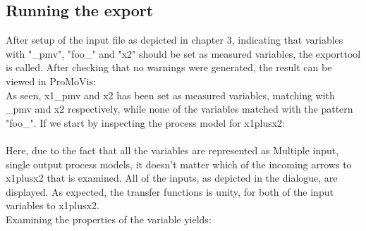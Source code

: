 \subsection{Running the export}
After setup of the input file as depicted in chapter 3, indicating that variables with "\_pmv", "foo\_" and "x2" should be set as measured variables, the exporttool is called. After checking that no warnings were generated, the result can be viewed in ProMoVis:
\setlength\fboxsep{0pt}
\setlength\fboxrule{0.5pt}
\\\newline
As seen,  x1\_pmv and x2 has been set as measured variables, matching with \_pmv and x2 respectively, while none of the variables matched with the pattern "foo\_". If we start by inspecting the process model for x1plusx2:\\\newline
\setlength\fboxsep{0pt}
\setlength\fboxrule{0.5pt}
\\\newline
Here, due to the fact that all the variables are represented as Multiple input, single output process models, it doesn't matter which of the incoming arrows to x1plusx2 that is examined. All of the inputs, as depicted in the dialogue, are displayed. As expected, the transfer functions is unity, for both of the input variables to x1plusx2. \\\newline
Examining the properties of the variable yields:

